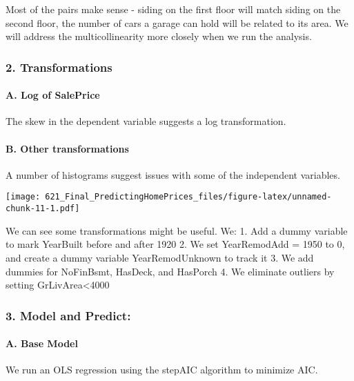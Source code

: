\documentclass[
]{article}
\begin{document}
Most of the pairs make sense - siding on the first floor will match
siding on the second floor, the number of cars a garage can hold will be
related to its area. We will address the multicollinearity more closely
when we run the analysis.

\hypertarget{transformations}{%
\subsubsection{2. Transformations}\label{transformations}}

\hypertarget{a.-log-of-saleprice}{%
\paragraph{A. Log of SalePrice}\label{a.-log-of-saleprice}}

The skew in the dependent variable suggests a log transformation.

\hypertarget{b.-other-transformations}{%
\paragraph{B. Other transformations}\label{b.-other-transformations}}

A number of histograms suggest issues with some of the independent
variables.

\texttt{[image: 621\_Final\_PredictingHomePrices\_files/figure-latex/unnamed-chunk-11-1.pdf]}

We can see some transformations might be useful. We: 1. Add a dummy
variable to mark YearBuilt before and after 1920 2. We set YearRemodAdd
= 1950 to 0, and create a dummy variable YearRemodUnknown to track it 3.
We add dummies for NoFinBsmt, HasDeck, and HasPorch 4. We eliminate
outliers by setting GrLivArea\textless4000

\hypertarget{model-and-predict}{%
\subsubsection{3. Model and Predict:}\label{model-and-predict}}

\hypertarget{a.-base-model}{%
\paragraph{A. Base Model}\label{a.-base-model}}

We run an OLS regression using the stepAIC algorithm to minimize AIC.
\end{document}
